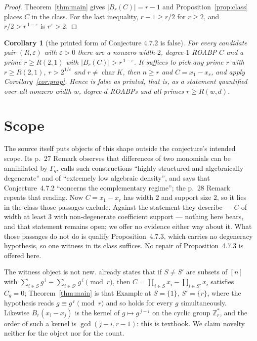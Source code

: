 \documentclass[11pt]{amsart}
\newtheorem{corollary}[theorem]{Corollary}
\theoremstyle{definition}
\theoremstyle{remark}
\newcommand{\KK}{K}
\newcommand{\Zrs}{\mathbb{Z}_r^{*}}
\newcommand{\Bad}{B_r}
\newcommand{\Gam}{\Gamma}
\begin{document}
\begin{proof}
Theorem~\ref{thm:main} gives $|\Bad(C)|=r-1$ and Proposition~\ref{prop:class} places $C$ in the
class. For the last inequality, $r-1\ge r/2$ for $r\ge 2$, and $r/2>r^{\,1-\varepsilon}$ is
$r^{\varepsilon}>2$.
\end{proof}

\begin{corollary}[the printed form of Conjecture 4.7.2 is false]\label{cor:conj}
For every candidate pair $(R,\varepsilon)$ with $\varepsilon>0$ there are a nonzero width-$2$,
degree-$1$ ROABP $C$ and a prime $r\ge R(2,1)$ with $|\Bad(C)|>r^{\,1-\varepsilon}$. It suffices
to pick any prime $r$ with $r\ge R(2,1)$, $r>2^{1/\varepsilon}$ and
$r\ne\operatorname{char}\KK$, then $n\ge r$ and $C=x_1-x_r$, and apply
Corollary~\ref{cor:prop}. Hence \cite[Conjecture~4.7.2]{SS} is false as printed, that is, as a
statement quantified over all nonzero width-$w$, degree-$d$ ROABPs and all primes
$r\ge R(w,d)$.
\end{corollary}

\section{Scope}\label{sec:notsettled}

\noindent The source itself puts objects of this shape outside the conjecture's intended scope. Its
p.~27 Remark observes that differences of two monomials can be annihilated by $\Gam_g$, calls such
constructions ``highly structured and algebraically degenerate'' and of ``extremely low algebraic
density'', and says that Conjecture~4.7.2 ``concerns the complementary regime''; the p.~28 Remark
repeats that reading. Now $C=x_1-x_r$ has width $2$ and support size $2$, so it lies in the class
those passages exclude. Against the statement they describe --- $C$ of width at least $3$ with
non-degenerate coefficient support --- nothing here bears, and that statement remains open; we
offer no evidence either way about it. What those passages do not do is qualify
Proposition~4.7.3, which carries no degeneracy hypothesis, so one witness in its class suffices. No
repair of Proposition~4.7.3 is offered here.

\medskip
\noindent The witness object is not new. \cite[Example~4.7.3, printed p.~27]{SS} already states
that if $S\ne S'$ are subsets of $[n]$ with
$\sum_{i\in S}g^{\,i}\equiv\sum_{i\in S'}g^{\,i}\pmod r$, then
$C=\prod_{i\in S}x_i-\prod_{i\in S'}x_i$ satisfies $C_g=0$; Theorem~\ref{thm:main} is that Example
at $S=\{1\}$, $S'=\{r\}$, where the hypothesis reads $g\equiv g^{\,r}\pmod r$ and so holds for
every $g$ simultaneously. Likewise $\Bad(x_i-x_j)$ is the kernel of $g\mapsto g^{\,j-i}$ on the
cyclic group $\Zrs$, and the order of such a kernel is $\gcd(j-i,r-1)$: this is textbook. We claim
novelty neither for the object nor for the count.
\end{document}
